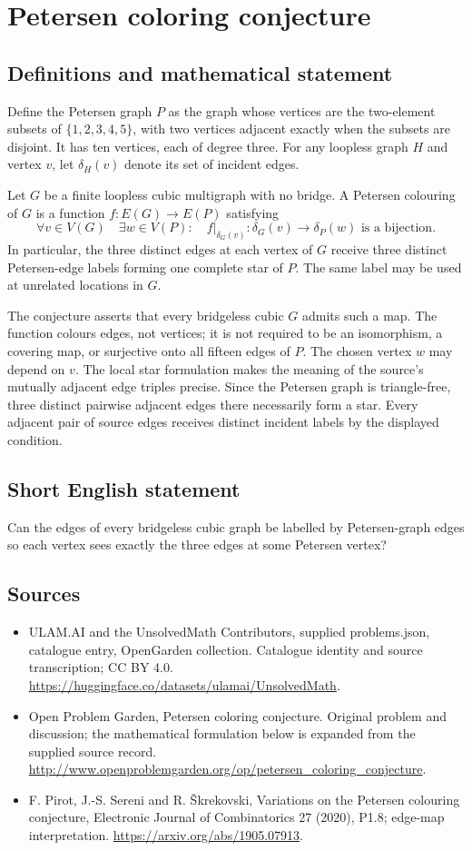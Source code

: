 \documentclass[11pt,a4paper]{article}
\begin{document}
\section*{Petersen coloring conjecture}\label{statement}

\subsection{Definitions and mathematical statement}
Define the Petersen graph $P$ as the graph whose
vertices are the two-element subsets of
$\{1,2,3,4,5\}$, with two vertices adjacent
exactly when the subsets are disjoint. It has
ten vertices, each of degree three. For any
loopless graph $H$ and vertex $v$, let
$\delta_H(v)$ denote its set of incident edges.

Let $G$ be a finite loopless cubic multigraph
with no bridge. A Petersen colouring of $G$
is a function $f:E(G)\to E(P)$ satisfying
\[
 \forall v\in V(G)\quad\exists w\in V(P):
 \quad f\big|_{\delta_G(v)}:
 \delta_G(v)\longrightarrow\delta_P(w)
 \text{ is a bijection}.
\]
In particular, the three distinct edges at
each vertex of $G$ receive three distinct
Petersen-edge labels forming one complete
star of $P$. The same label may be used at
unrelated locations in $G$.

The conjecture asserts that every bridgeless
cubic $G$ admits such a map. The function
colours edges, not vertices; it is not required
to be an isomorphism, a covering map, or
surjective onto all fifteen edges of $P$.
The chosen vertex $w$ may depend on $v$.
The local star formulation makes the meaning
of the source's mutually adjacent edge triples
precise. Since the Petersen graph is triangle-free,
three distinct pairwise adjacent edges there
necessarily form a star. Every adjacent pair
of source edges receives distinct incident
labels by the displayed condition.
\subsection{Short English statement}
Can the edges of every bridgeless cubic graph be labelled by Petersen-graph edges so each vertex sees exactly the three edges at some Petersen vertex?
\subsection{Sources}
\begin{itemize}
\item[S1] ULAM.AI and the UnsolvedMath Contributors, supplied problems.json, catalogue entry, OpenGarden collection. Catalogue identity and source transcription; CC BY 4.0.
\url{https://huggingface.co/datasets/ulamai/UnsolvedMath}.
\item[S2] Open Problem Garden, Petersen coloring conjecture. Original problem and discussion; the mathematical formulation below is expanded from the supplied source record.
\url{http://www.openproblemgarden.org/op/petersen_coloring_conjecture}.
\item[S3] F. Pirot, J.-S. Sereni and R. Škrekovski, Variations on the Petersen colouring conjecture, Electronic Journal of Combinatorics 27 (2020), P1.8; edge-map interpretation.
\url{https://arxiv.org/abs/1905.07913}.
\end{itemize}
\end{document}
